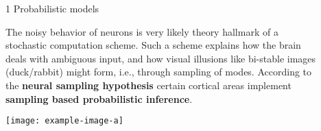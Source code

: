 \newcommand{\blockSpaceOne}{\vspace{1.3cm}}
\newcommand{\interBlockSpaceOne}{\vspace{1.5cm}}
\newcommand{\blockSpaceTwo}{\vspace{1.3cm}}
\newcommand{\interBlockSpaceTwo}{\vspace{.95cm}}
\newcommand{\secondBlockImSpace}{\vspace{.25cm}}
\newcommand{\thirdBlockImSpace}{\vspace{1.125cm}}

\begin{frame} %
	\vspace{-.5cm}
	\begin{columns}
		\begin{column}{.005\textwidth}\end{column}

		
		\begin{column}{0.99\textwidth}
			\begin{columns}[t]

				\begin{column}{.01\textwidth}\end{column}

				\begin{column}{0.32\textwidth}


					\begin{block}{\large 1 Probabilistic models}
					\blockSpaceOne


					\justifying
					\begin{adjustwidth}{1.cm}{1.cm}
					 The noisy behavior of neurons is very likely theory hallmark of a stochastic computation scheme.
					 Such a scheme explains how the brain deals with ambiguous input, and how visual illusions like bi-stable images (duck/rabbit) might form, i.e., through sampling of modes.
					 According to the \textbf{neural sampling hypothesis} \cite{fiser2010statistically} certain cortical areas implement \textbf{sampling based probabilistic inference}.

					\end{adjustwidth}

					\vspace{1.cm}
					\begin{center}
						\texttt{[image: example-image-a]}
					\end{center}

					\begin{adjustwidth}{1cm}{1cm}
					

\end{adjustwidth}
\end{block}
\end{column}
\end{columns}
\end{column}
\end{columns}
\end{frame}
